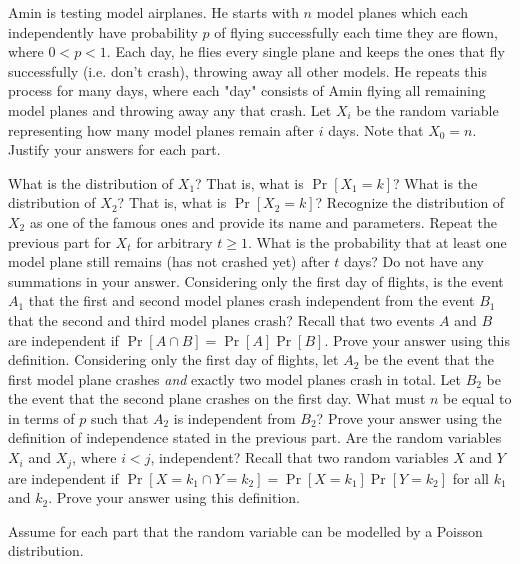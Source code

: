 \documentclass[11pt]{article}
\begin{document}
Amin is testing model airplanes. He starts with $n$ model planes which each independently have probability $p$ of flying successfully each time they are flown, where $0<p<1$. Each day, he flies every single plane and keeps the ones that fly successfully (i.e. don't crash), throwing away all other models. He repeats this process for many days, where each "day" consists of Amin flying all remaining model planes and throwing away any that crash. Let $X_i$ be the random variable representing how many model planes remain after $i$ days. Note that $X_0 = n$. Justify your answers for each part.
\begin{Parts}
    \Part What is the distribution of $X_1$? That is, what is $\Pr[X_1=k]$? 
    \Part What is the distribution of $X_2$? That is, what is $\Pr[X_2=k]$? Recognize the distribution of $X_2$ as one of the famous ones and provide its name and parameters.
    \Part Repeat the previous part for $X_t$ for arbitrary $t \geq 1$.
    \Part What is the probability that at least one model plane still remains (has not crashed yet) after $t$ days? Do not have any summations in your answer.
    \Part Considering only the first day of flights, is the event $A_1$ that the first and second model planes crash independent from the event $B_1$ that the second and third model planes crash? Recall that two events $A$ and $B$ are independent if $\Pr[A\cap B] = \Pr[A]\Pr[B]$. Prove your answer using this definition.
    \Part Considering only the first day of flights, let $A_2$ be the event that the first model plane crashes 
    \emph{and} exactly two model planes crash in total. Let $B_2$ be the event that 
    the second plane crashes on the first day. What must $n$ be equal to 
    in terms of $p$ such that $A_2$ is independent from $B_2$? Prove your answer using the definition 
    of independence stated in the previous part.
    \Part Are the random variables $X_i$ and $X_j$, where $i<j$, independent? Recall that two random variables $X$ and $Y$ are independent if $\Pr[X=k_1 \cap Y=k_2] = \Pr[X=k_1]\Pr[Y=k_2]$ for all $k_1$ and $k_2$. Prove your answer using this definition.
\end{Parts}

Assume for each part that the random variable can be modelled by a Poisson distribution.
\end{document}
